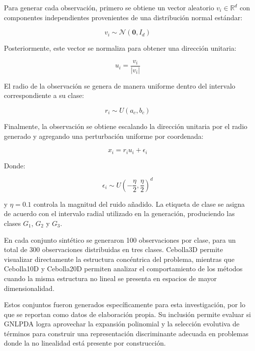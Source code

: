 Para generar cada observación, primero se obtiene un vector aleatorio $v_i \in \mathbb{R}^d$ con componentes independientes provenientes de una distribución normal estándar:

\begin{equation}
	v_i \sim \mathcal{N}(\mathbf{0}, I_d)	
	\label{eq:EM16}
\end{equation}

Posteriormente, este vector se normaliza para obtener una dirección unitaria:

\begin{equation}
	u_i = \frac{v_i}{|v_i|}	
	\label{eq:EM17}
\end{equation}

El radio de la observación se genera de manera uniforme dentro del intervalo correspondiente a su clase:

\begin{equation}
	r_i \sim U(a_c,b_c)	
	\label{eq:EM18}
\end{equation}

Finalmente, la observación se obtiene escalando la dirección unitaria por el radio generado y agregando una perturbación uniforme por coordenada:

\begin{equation}
	x_i = r_iu_i + \epsilon_i	
	\label{eq:EM19}
\end{equation}

Donde:

\begin{equation}
	\epsilon_i \sim U\left(-\frac{\eta}{2}, \frac{\eta}{2}\right)^d
	\label{eq:EM20}
\end{equation}

y $\eta = 0.1$ controla la magnitud del ruido añadido. La etiqueta de clase se asigna de acuerdo con el intervalo radial utilizado en la generación, produciendo las clases $G_1$, $G_2$ y $G_3$.

En cada conjunto sintético se generaron 100 observaciones por clase, para un total de 300 observaciones distribuidas en tres clases. Cebolla3D permite visualizar directamente la estructura concéntrica del problema, mientras que Cebolla10D y Cebolla20D permiten analizar el comportamiento de los métodos cuando la misma estructura no lineal se presenta en espacios de mayor dimensionalidad.

Estos conjuntos fueron generados específicamente para esta investigación, por lo que se reportan como datos de elaboración propia. Su inclusión permite evaluar si GNLPDA logra aprovechar la expansión polinomial y la selección evolutiva de términos para construir una representación discriminante adecuada en problemas donde la no linealidad está presente por construcción.

